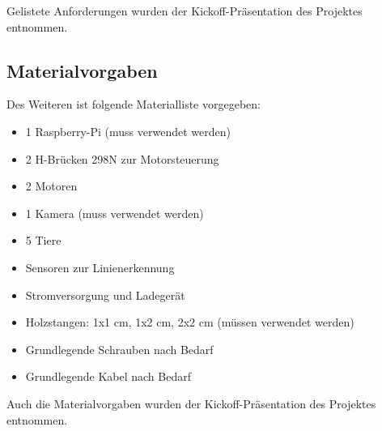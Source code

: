 Gelistete Anforderungen wurden der Kickoff-Präsentation des Projektes entnommen.

\subsection{Materialvorgaben}

Des Weiteren ist folgende Materialliste vorgegeben:

\begin{itemize}
    \item 1 Raspberry-Pi (muss verwendet werden)
    \item 2 H-Brücken 298N zur Motorsteuerung
    \item 2 Motoren
    \item 1 Kamera (muss verwendet werden)
    \item 5 Tiere
    \item Sensoren zur Linienerkennung
    \item Stromversorgung und Ladegerät
    \item Holzstangen: 1x1 cm, 1x2 cm, 2x2 cm (müssen verwendet werden)
    \item Grundlegende Schrauben nach Bedarf
    \item Grundlegende Kabel nach Bedarf 
\end{itemize}

Auch die Materialvorgaben wurden der Kickoff-Präsentation des Projektes entnommen.

